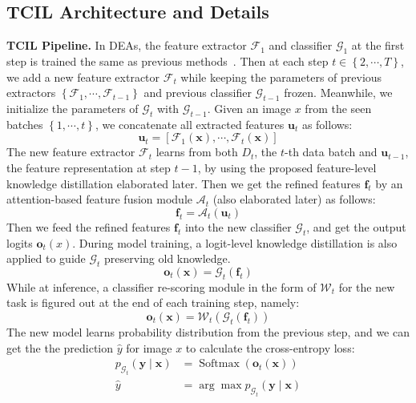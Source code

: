 \documentclass[letterpaper]{article} %
\begin{document}
\subsection{TCIL Architecture and Details}

\textbf{TCIL Pipeline.} 
In DEAs, the feature extractor $\mathcal{F}_{1}$ and classifier $\mathcal{G}_{1}$ at the first step is trained the same as previous methods~\cite{p24, e2, w20, t54}. Then at each step $t \in \left\{2, \cdots, T\right\}$, we add a new feature extractor $\mathcal{F}_{t}$ while keeping the parameters of previous extractors $\left\{\mathcal{F}_{1}, \cdots, \mathcal{F}_{t-1}\right\}$ and previous classifier $\mathcal{G}_{t-1}$ frozen. Meanwhile, we initialize the parameters of $\mathcal{G}_{t}$ with $\mathcal{G}_{t-1}$. Given an image $x$ from the seen batches $\left\{1, \cdots, t\right\}$, we concatenate all extracted features $\boldsymbol{u}_{t}$ as follows:
\begin{equation}
\boldsymbol{u}_{t}
=\left[\mathcal{F}_{1}(\boldsymbol{x}), \cdots, \mathcal{F}_{t}(\boldsymbol{x})\right]
\label{e1}
\end{equation}
The new feature extractor $\mathcal{F}_{t}$ learns from both ${D}_{t}$, the $t$-th data batch and $\boldsymbol{u}_{t-1}$, the feature representation at step $t-1$, by using the proposed feature-level knowledge distillation elaborated later. Then we get the refined features $\boldsymbol{f}_{t}$  by an attention-based feature fusion module $\mathcal{A}_t$ (also elaborated later) as follows:
\begin{equation}
\boldsymbol{f}_{t}=\mathcal{A}_t(\boldsymbol{u}_{t}) 
\label{e2}
\end{equation}
Then we feed the refined features $\boldsymbol{f}_{t}$ into the new classifier $\mathcal{G}_{t}$, and get the output logits $\boldsymbol{o}_{t}(x)$. During model training, a logit-level knowledge distillation is also applied to guide $\mathcal{G}_{t}$ preserving old knowledge.
\begin{equation}
\boldsymbol{o}_{t}(\boldsymbol{x})=\mathcal{G}_{t}(\boldsymbol{f}_{t})
\label{e3}
\end{equation}
While at inference, a classifier re-scoring module in the form of $\mathcal{W}_{t}$ for the new task is figured out at the end of each training step, namely:
\begin{equation}
\boldsymbol{o}_{t}(\boldsymbol{x})=\mathcal{W}_{t}\left(\mathcal{G}_{t}(\boldsymbol{f}_{t})\right)
\label{e32}
\end{equation}
The new model learns probability distribution from the previous step, and we can get the the prediction $\hat{y}$ for image $x$ to calculate the cross-entropy loss:
\begin{equation}
\begin{aligned}
p_{\mathcal{G}_{t}}(\boldsymbol{y} \mid \boldsymbol{x})&=\operatorname{Softmax}\left(\boldsymbol{o}_{t}(\boldsymbol{x})\right) \\
\hat{y}&=\arg \max p_{\mathcal{G}_{t}}(\boldsymbol{y} \mid \boldsymbol{x})
\label{e4}
\end{aligned}
\end{equation}
\end{document}
